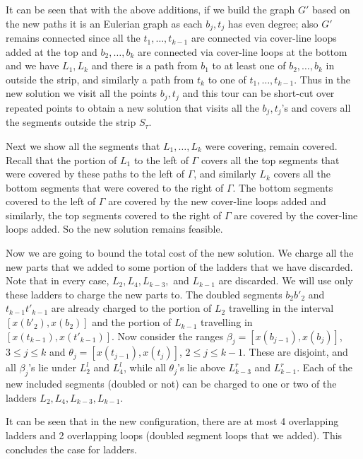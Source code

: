 \documentclass[pdflatex,sn-mathphys-num]{sn-jnl}
\theoremstyle{thmstyleone}
\begin{document}
    It can be seen that with the above additions, if we build the graph $G'$ based on the new paths it is an Eulerian graph as each $b_j,t_j$ has even degree; also $G'$ remains connected since
    all the $t_1,\ldots,t_{k-1}$ are connected via cover-line loops added at the top and $b_2,\ldots,b_k$ are connected via cover-line loops at the bottom and we have $L_1,L_k$ and there is a path from $b_1$ to at least one of $b_2,\ldots,b_k$ in outside the strip, and similarly a path from $t_k$ to one of $t_1,\ldots,t_{k-1}$. Thus in the new solution we visit all the points $b_j,t_j$ and this tour can be short-cut over repeated points to obtain a new solution that visits all the $b_j,t_j$'s and covers all the segments outside the strip $S_\tau$. 

    Next we show all the segments that $L_1,\ldots,L_k$ were covering, remain covered. Recall that the portion of $L_1$ to the left of $\Gamma$ covers all the top segments that were covered by these paths to the left of $\Gamma$, and similarly $L_k$ covers all the bottom segments that were covered to the right of $\Gamma$. The bottom segments covered to the left of $\Gamma$ are covered by the 
    new cover-line loops added and similarly, the top segments covered to the right of $\Gamma$ are covered by the cover-line loops added. So the new solution remains feasible.
    
    Now we are going to bound the total cost of the new solution. We charge all the new parts that we added to some portion of the ladders that we have discarded. Note that in every case, $L_2, L_4, L_{k - 3},$ and $L_{k - 1}$ are discarded. We will use only these ladders to charge the new parts to.
    The doubled segments $b_2b'_2$ and $t_{k - 1}t'_{k - 1}$ are already charged to the portion of $L_2$ travelling in the interval $[x(b'_2), x(b_2)]$ and the portion of $L_{k - 1}$ travelling in $[x(t_{k - 1}), x(t'_{k - 1})]$. 
    Now consider the ranges $\beta_j = [x(b_{j - 1}), x(b_{j})]$, $3\leq j\leq k$ and $\theta_j = [x(t_{j - 1}), x(t_{j})]$, $2\leq j\leq k - 1$. These are disjoint, and all $\beta_j$'s lie under $L^l_2$ and $L^l_4$, while all $\theta_j$'s lie above $L^r_{k-3}$ and $L^r_{k-1}$. 
    Each of the new included segments (doubled or not) can be charged to one or two of the ladders $L_2, L_4, L_{k-3}, L_{k - 1}$.

    It can be seen that in the new configuration, there are at most 4 overlapping ladders and 2 overlapping loops (doubled segment loops that we added). This concludes the case for ladders.
\end{document}
